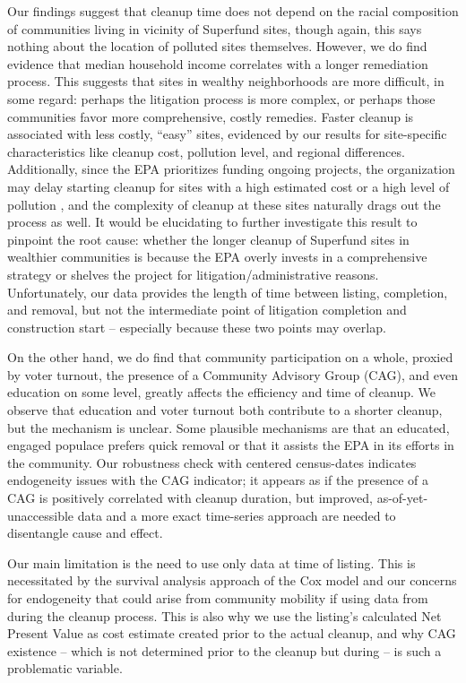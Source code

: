 \documentclass[12pt]{article}
\begin{document}
{Our findings suggest that cleanup time does not depend on the racial composition of communities living in vicinity of Superfund sites, though again, this says nothing about the location of polluted sites themselves. However, we do find evidence that median household income correlates with a longer remediation process. This suggests that sites in wealthy neighborhoods are more difficult, in some regard: perhaps the litigation process is more complex, or perhaps those communities favor more comprehensive, costly remedies. Faster cleanup is associated with less costly, ``easy'' sites, evidenced by our results for site-specific characteristics like cleanup cost, pollution level, and regional differences. Additionally, since the EPA prioritizes funding ongoing projects, the organization may delay starting cleanup for sites with a high estimated cost or a high level of pollution \parencite{GAO2015}, and the complexity of cleanup at these sites naturally drags out the process as well. 
It would be elucidating to further investigate this result to pinpoint the root cause: whether the longer cleanup of Superfund sites in wealthier communities is because the EPA overly invests in a comprehensive strategy or shelves the project for litigation/administrative reasons. Unfortunately, our data provides the length of time between listing, completion, and removal, but not the intermediate point of litigation completion and construction start -- especially because these two points may overlap.

On the other hand, we do find that community participation on a whole, proxied by voter turnout, the presence of a Community Advisory Group (CAG), and even education on some level, greatly affects the efficiency and time of cleanup. We observe that education and voter turnout both contribute to a shorter cleanup, but the mechanism is unclear. Some plausible mechanisms are that an educated, engaged populace prefers quick removal or that it assists the EPA in its efforts in the community. Our robustness check with centered census-dates indicates endogeneity issues with the CAG indicator; it appears as if the presence of a CAG is positively correlated with cleanup duration, but improved, as-of-yet-unaccessible data and a more exact time-series approach are needed to disentangle cause and effect.

Our main limitation is the need to use only data at time of listing. This is necessitated by the survival analysis approach of the Cox model and our concerns for endogeneity that could arise from community mobility if using data from during the cleanup process. This is also why we use the listing's calculated Net Present Value as cost estimate created prior to the actual cleanup, and why CAG existence -- which is not determined prior to the cleanup but during -- is such a problematic variable. 

}
\end{document}
